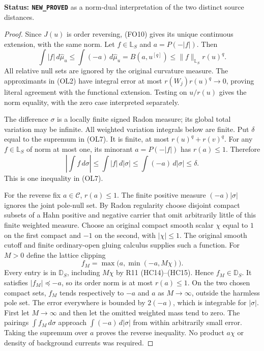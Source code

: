 \documentclass[11pt,a4paper]{article}
\numberwithin{equation}{section}
\theoremstyle{definition}
\theoremstyle{remark}
\begin{document}
\noindent\textbf{Status: \texttt{NEW\_PROVED}} as a
norm-dual interpretation of the two distinct source distances.

\begin{proof}
Since $J(u)$ is order reversing, \textup{(FO10)} gives its
unique continuous extension, with the same norm.  Let
$f\in\mathbb L_S$ and $a=P(-|f|)$.  Then
\[
 \int|f|\,d\widehat\mu_u
       \le\int(-a)\,d\widehat\mu_u
       =B(a,u^{[q]})\le\|f\|_{\mathbb L_S}r(u)^q.
 \tag{OL8}
\]
All relative null sets are ignored by the original curvature
measure.  The approximants in \textup{(OL2)} have integral
error at most $r(W_j)r(u)^q\to0$, proving literal agreement
with the functional extension.  Testing on $u/r(u)$ gives
the norm equality, with the zero case interpreted separately.

The difference $\sigma$ is a locally finite signed
Radon measure; its global total variation may be infinite.
All weighted variation integrals below are finite.
Put $\delta$ equal to the supremum in \textup{(OL7)}.
It is finite, at most $r(u)^q+r(v)^q$.
For any $f\in\mathbb L_S$ of norm at most one, its
minorant $a=P(-|f|)$ has $r(a)\le1$.  Therefore
\[
 \left|\int f\,d\sigma\right|
          \le\int|f|\,d|\sigma|
          \le\int(-a)\,d|\sigma|\le\delta.
 \tag{OL9}
\]
This is one inequality in \textup{(OL7)}.

For the reverse fix $a\in\mathscr C$, $r(a)\le1$.
The finite positive measure $(-a)|\sigma|$ ignores the
joint pole-null set.  By Radon regularity choose disjoint
compact subsets of a Hahn positive and negative carrier
that omit arbitrarily little of this finite weighted measure.
Choose an original compact smooth scalar $\chi$ equal to
$1$ on the first compact and $-1$ on the second, with
$|\chi|\le1$.  The original smooth cutoff and finite
ordinary-open gluing calculus supplies such a function.
For $M>0$ define the lattice clipping
\[
                     f_M=\max\bigl(a,\min(-a,M\chi)\bigr).
 \tag{OL10}
\]
Every entry is in $\mathbb D_S$, including $M\chi$ by
R11 \textup{(HC14)--(HC15)}.  Hence $f_M\in\mathbb D_S$.
It satisfies $|f_M|\preceq-a$, so its order norm is at
most $r(a)\le1$.  On the two chosen compact sets,
$f_M$ tends respectively to $-a$ and $a$ as $M\to\infty$,
outside the harmless pole set.  The error everywhere is
bounded by $2(-a)$, which is integrable for $|\sigma|$.
First let $M\to\infty$ and then let the omitted weighted
mass tend to zero.  The pairings $\int f_M\,d\sigma$
approach $\int(-a)\,d|\sigma|$ from within arbitrarily
small error.  Taking the supremum over $a$ proves the
reverse inequality.  No product $a\chi$ or density of
background currents was required.


\end{proof}
\end{document}
